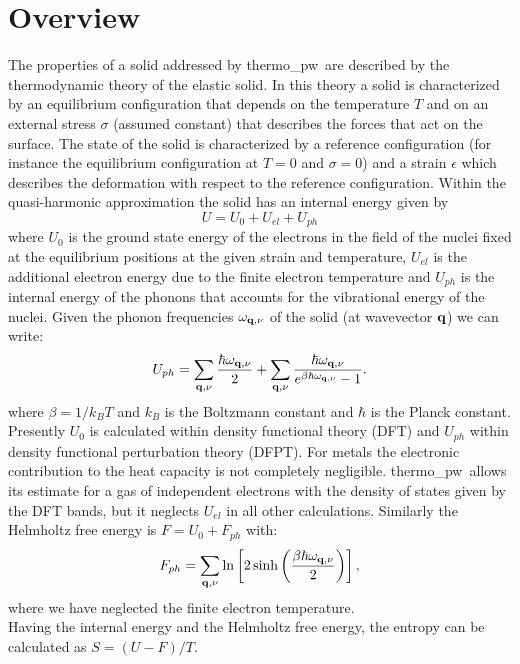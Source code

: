 \documentclass[12pt,a4paper]{article}
\def\tpw{{\sc thermo\_pw}}
\begin{document}
\section{\color{coral}Overview}
The properties of a solid addressed by \tpw\ are described by the thermodynamic
theory of the elastic solid. In this theory a solid is characterized by an
equilibrium configuration that depends on the temperature $T$ and on an
external stress $\sigma$ (assumed constant) that describes the forces 
that act on the surface. The state
of the solid is characterized by a reference configuration 
(for instance the equilibrium configuration at $T=0$ and $\sigma=0$) and 
a strain $\epsilon$ which describes the deformation with respect to the 
reference configuration. 
Within the quasi-harmonic approximation the solid has an internal
energy given by  
\begin{equation}
U=U_0 + U_{el} + U_{ph}
\end{equation}
where $U_0$ is the ground state energy of the electrons in the field 
of the nuclei fixed at the equilibrium positions at the given strain and
temperature, $U_{el}$ is the additional electron energy due to the 
finite electron temperature and $U_{ph}$ is the internal energy of the 
phonons that accounts for the vibrational energy of the nuclei. 
Given the phonon frequencies $\omega_{{\bf q},\nu}$ of the solid 
(at wavevector ${\bf q}$) we can write:
\begin{equation}
U_{ph} = \sum_{{\bf q},\nu} {\hbar \omega_{{\bf q},\nu} \over 2}
+ \sum_{{\bf q},\nu} {\hbar \omega_{{\bf q},\nu} \over 
e^{\beta \hbar \omega_{{\bf q},\nu}}-1}.
\label{uvib}
\end{equation}
where $\beta=1/ k_B T$ and $k_B$ is the Boltzmann constant and $\hbar$ is the
Planck constant.
Presently $U_0$ is calculated within density functional theory (DFT) and
$U_{ph}$ within density functional perturbation theory (DFPT). 
For metals the electronic contribution to the heat capacity is not 
completely negligible. \tpw\ allows its estimate for a gas of 
independent electrons with the density of states given by the DFT bands,
but it neglects $U_{el}$ in all other calculations.
Similarly the Helmholtz free energy is $F=U_0+F_{ph}$ with:
\begin{equation}
F_{ph} = \sum_{{\bf q},\nu} \ln \left[ 2 \sinh \left({\beta \hbar 
\omega_{{\bf q},\nu} \over 2}\right) \right],
\nonumber
\end{equation}
where we have neglected the finite electron temperature. \\
Having the internal energy and the Helmholtz free energy, the entropy can 
be calculated as $S=(U-F)/T$.
\end{document}
